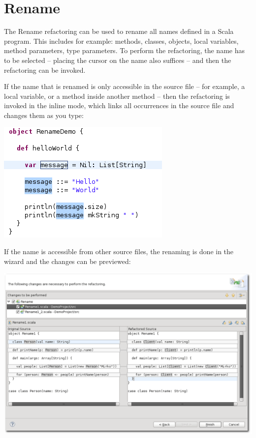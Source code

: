 \documentclass[10pt,a4paper,oneside]{scrreprt}
\begin{document}
\section{Rename}

The Rename refactoring can be used to rename all names defined in a Scala program. This includes for example: methods, classes, objects, local variables, method parameters, type parameters. To perform the refactoring, the name has to be selected -- placing the cursor on the name also suffices -- and then the refactoring can be invoked.

If the name that is renamed is only accessible in the source file -- for example, a local variable, or a method inside another method -- then the refactoring is invoked in the inline mode, which links all occurrences in the source file and changes them as you type:

\begin{center}
  \includegraphics[width=0.5\linewidth]{rename_screenshot_3.png}
\end{center}

If the name is accessible from other source files, the renaming is done in the wizard and the changes can be previewed:

\begin{center}
  \includegraphics[width=\linewidth]{rename_screenshot_2.png}
\end{center}
\end{document}
